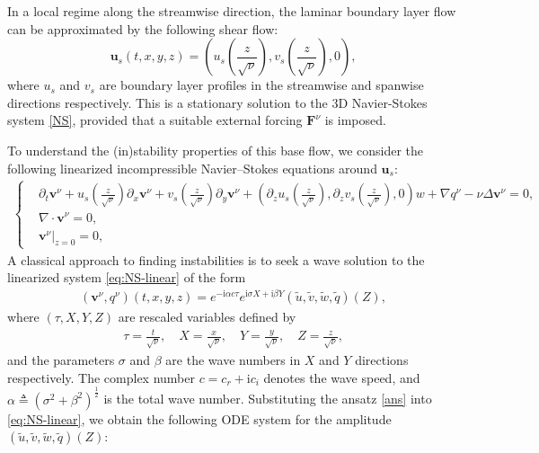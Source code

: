 \documentclass[reqno,11pt]{amsart}
\numberwithin{equation}{section}
\numberwithin{equation}{section}
\theoremstyle{plain}
\begin{document}
In a local regime along the streamwise direction, the laminar boundary layer flow can be approximated by the following shear flow: $$\textbf{u}_s(t,x,y,z)=\left(u_s(\frac{z}{\sqrt{\nu}}),v_s(\frac{z}{\sqrt{\nu}}),0\right),$$ 
where $u_s$ and $v_s$ are boundary layer profiles in the streamwise and spanwise directions respectively. This is a stationary solution to the 3D Navier-Stokes system \eqref{NS}, provided that a suitable external forcing $\textbf{F}^\nu$ is imposed.



To understand the (in)stability properties of this base flow, we consider the following  linearized incompressible Navier–Stokes equations around $\textbf{u}_s$:
\begin{align}\label{eq:NS-linear}
    \left\{
    \begin{aligned}
        &\partial_{t}\textbf{v}^\nu+u_s(\frac{z}{\sqrt{\nu}})\partial_{x}\textbf{v}^\nu+v_s(\frac{z}{\sqrt{\nu}})\partial_{y}\textbf{v}^\nu
        +\left(\partial_{z}u_s(\frac{z}{\sqrt{\nu}}),\partial_{z}v_s(\frac{z}{\sqrt{\nu}}),0\right)w+\nabla q^\nu-\nu \Delta \textbf{v}^\nu=0,\\ %
         &\nabla\cdot \textbf{v}^\nu=0,\\ 
        &\textbf{v}^\nu|_{z=0}=0,%
    \end{aligned}
    \right.
\end{align}
A classical approach to finding instabilities is to seek a wave solution to the linearized system \eqref{eq:NS-linear} of the form
\begin{align}
(\textbf{v}^{\nu}, q^\nu)(t,x,y,z)=e^{-\mathrm{i}\alpha c\tau}e^{\mathrm{i}\sigma  X+\mathrm{i}\beta Y}(\tilde{u},\tilde{v},\tilde{w}, \tilde{q})(Z),\label{ans}
\end{align}
where $(\tau,X,Y,Z)$ are rescaled variables defined by
\begin{align*}
	\tau=\frac{t}{\sqrt{\nu}},\quad X=\frac{x}{\sqrt{\nu}},\quad Y=\frac{y}{\sqrt{\nu}},\quad Z=\frac{z}{\sqrt{\nu}},
\end{align*}
and the parameters $\sigma$ and $\beta$ are the wave numbers in $X$ and $Y$ directions respectively. The complex number $c=c_r+\mathrm{i}c_i$ denotes the wave speed, and $\alpha\triangleq(\sigma^2+\beta^2)^\frac{1}{2}$ is the total wave number. Substituting the ansatz \eqref{ans} into \eqref{eq:NS-linear}, we obtain the following ODE system for the amplitude  $(\tilde{u},\tilde{v},\tilde{w}, \tilde{q})(Z)$:
\end{document}
